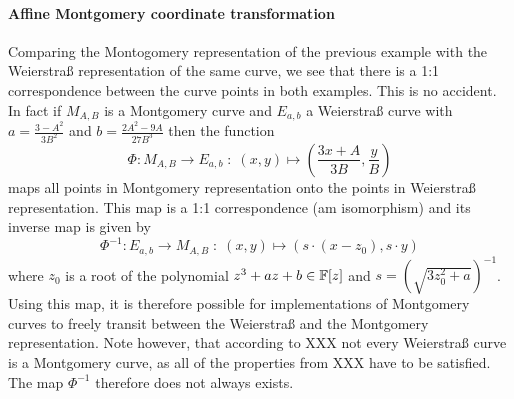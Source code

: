 \paragraph{Affine Montgomery coordinate transformation} Comparing the Montogomery representation of the previous example with the Weierstraß representation of the same curve, we see that there is a 1:1 correspondence between the curve points in both examples. This is no accident. In fact if $M_{A,B}$ is a Montgomery curve and $E_{a,b}$ a Weierstraß curve with $a = \frac{3-A^2}{3B^2}$ and $b= \frac{2A^2 -9A}{27B^3}$ then the function
\begin{equation}
\Phi: M_{A,B} \to E_{a,b}\; : \; (x,y) \mapsto \left(\frac{3x + A}{3B}, \frac{y}{B}\right)
\end{equation}
maps all points in Montgomery representation onto the points in Weierstraß representation. This map is a 1:1 correspondence (am isomorphism) and its inverse map is given by
\begin{equation}
\Phi^{-1}: E_{a,b} \to M_{A,B}\; : \; (x,y) \mapsto \left(s\cdot(x-z_0), s\cdot y\right)
\end{equation}
where $z_0$ is a root of the polynomial $z^3 + a z + b \in \mathbb{F}[z]$ and $s=({\sqrt{3z_0^{2}+a}})^{-1}$. Using this map, it is therefore possible for implementations of Montgomery curves to freely transit between the Weierstraß and the Montgomery representation. Note however, that according to XXX not every Weierstraß curve is a Montgomery curve, as all of the properties from XXX have to be satisfied. The map $\Phi^{-1}$ therefore does not always exists. 
